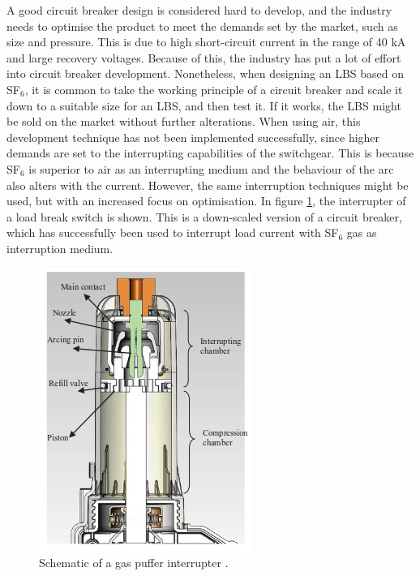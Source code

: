 \documentclass[10pt,b5paper,twoside]{article}
\begin{document}
A good circuit breaker design is considered hard to develop, and the industry needs to optimise the product to meet the demands set by the market, such as size and pressure. This is due to high short-circuit current in the range of 40 kA and large recovery voltages. Because of this, the industry has put a lot of effort into circuit breaker development. Nonetheless, when designing an LBS based on SF$_6$, it is common to take the working principle of a circuit breaker and scale it down to a suitable size for an LBS, and then test it. If it works, the LBS might be sold on the market without further alterations. When using air, this development technique has not been implemented successfully, since higher demands are set to the interrupting capabilities of the switchgear. This is because SF$_6$ is superior to air as an interrupting medium and the behaviour of the arc also alters with the current. However, the same interruption techniques might be used, but with an increased focus on optimisation. In figure \ref{fig:selfBlastandPuffer}, the interrupter of a load break switch is shown. This is a down-scaled version of a circuit breaker, which has successfully been used to interrupt load current with SF$_6$ gas as interruption medium. 

\begin{figure} [H]
\centering
\includegraphics[scale=0.6]{Bilder/Theory/LBSselfblastandPuffer.png}
\caption{Schematic of a gas puffer interrupter \cite{bib:CBAC}.} \label{fig:selfBlastandPuffer}
\end{figure}
\end{document}
